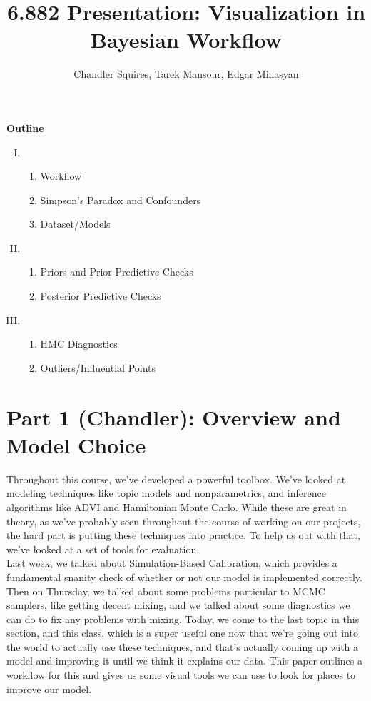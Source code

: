 \documentclass[]{article}
\title{6.882 Presentation: Visualization in Bayesian Workflow}
\author{Chandler Squires, Tarek Mansour, Edgar Minasyan}
\date{}
\begin{document}
\maketitle
\thispagestyle{empty}

\textbf{Outline}
\begin{enumerate}[I.]
	\item \begin{enumerate}[1)]
		\item Workflow
		\item Simpson's Paradox and Confounders
		\item Dataset/Models
	\end{enumerate}
	\item \begin{enumerate}[1)]
		\item Priors and Prior Predictive Checks
		\item Posterior Predictive Checks
	\end{enumerate}
	\item \begin{enumerate}[1)]
		\item HMC Diagnostics
		\item Outliers/Influential Points
	\end{enumerate}
\end{enumerate}

\section*{Part 1 (Chandler): Overview and Model Choice}

Throughout this course, we've developed a powerful toolbox. We've looked at modeling techniques like topic models and nonparametrics, and inference algorithms like ADVI and Hamiltonian Monte Carlo. While these are great in theory, as we've probably seen throughout the course of working on our projects, the hard part is putting these techniques into practice. To help us out with that, we've looked at a set of tools for evaluation.
\\

Last week, we talked about Simulation-Based Calibration, which provides a fundamental snanity check of whether or not our model is implemented correctly. Then on Thursday, we talked about some problems particular to MCMC samplers, like getting decent mixing, and we talked about some diagnostics we can do to fix any problems with mixing. Today, we come to the last topic in this section, and this class, which is a super useful one now that we're going out into the world to actually use these techniques, and that's actually coming up with a model and improving it until we think it explains our data. This paper outlines a workflow for this and gives us some visual tools we can use to look for places to improve our model.
\\
\end{document}
